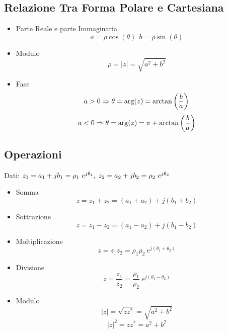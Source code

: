 \subsection{Relazione Tra Forma Polare e Cartesiana}
    \begin{itemize}
        \item {Parte Reale e parte Immaginaria
            \[
                a = \rho \cos(\theta)  \ \ b = \rho \sin(\theta)   
            \]
        }
        \item {Modulo
            \[
                \rho = |z| = \sqrt{a^2+b^2}
            \]
        }
        \item {Fase
            \[
                 a \\> 0 \Rightarrow \theta = \arg(z) = \arctan\left(\frac{b}{a}\right)
            \]
            \[
                a \\< 0 \Rightarrow \theta = \arg(z) =\pi + \arctan\left(\frac{b}{a}\right) 
            \]

        }
    \end{itemize}


\subsection{Operazioni}
    Dati: $z_1 = a_1 + jb_1 = \rho_1 \ e^{j\theta_1},\hspace{0.1cm} z_2 = a_2 + jb_2 = \rho_2 \ e^{j\theta_2} $
    \begin{itemize}
        \item {Somma
            \[
                z = z_1 + z_2 = (a_1 + a_2) + j(b_1 + b_2)
            \]
        }
        \item {Sottrazione
            \[
                z = z_1 - z_2 = (a_1 - a_2) + j(b_1 - b_2)
            \]
        }
        \item {Moltiplicazione
            \[
                z = z_1 z_2 = \rho_1\rho_2 \ e^{j(\theta_1+\theta_2)}
            \]
        }
        \item {Divisione
            \[
                z = \frac{z_1}{z_2} = \frac{\rho_1}{\rho_2} \ e^{j(\theta_1-\theta_2)}
            \]
        }
        \item {Modulo
            \[
                |z| = \sqrt{zz^*} = \sqrt{a^2+b^2}  
            \]
            \[
                |z|^2 = zz^* = a^2+b^2  
            \]
        }
    \end{itemize}

